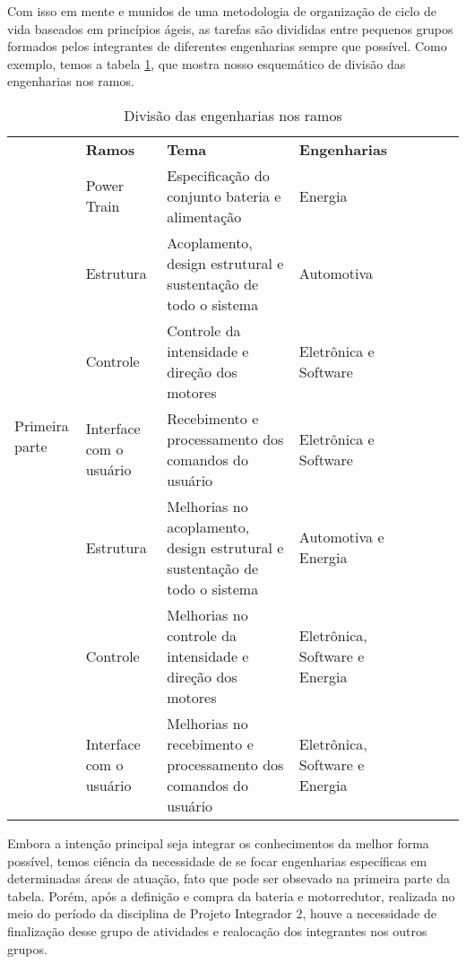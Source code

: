 Com isso em mente e munidos de uma metodologia de organização de ciclo de vida baseados em princípios ágeis, as tarefas são divididas entre pequenos grupos formados pelos integrantes de diferentes engenharias sempre que possível. Como exemplo, temos a tabela \ref{tab:divisao_ramos}, que mostra nosso esquemático de divisão das engenharias nos ramos.

\begin{table}[]
	\centering
	\caption{Divisão das engenharias nos ramos}
	\label{tab:divisao_ramos}
	\begin{tabular}{lp{}|lp{}|lp{}|lp{}}
		\cline{2-4}	& \textbf{Ramos}  & \textbf{Tema} & \textbf{Engenharias} & \\ \cline{1-4}

		\multicolumn{1}{|l|}{\multirow{6}{*}{{Primeira parte}}} & Power Train & Especificação do conjunto bateria e alimentação & Energia & \\ \cline{2-4}
		\multicolumn{1}{|l|}{} & Estrutura & Acoplamento, design estrutural e sustentação de todo o sistema & Automotiva & \\ \cline{2-4}
		\multicolumn{1}{|l|}{} & Controle & Controle da intensidade e direção dos motores & Eletrônica e Software & \\ \cline{2-4}
		\multicolumn{1}{|l|}{} & Interface com o usuário & Recebimento e processamento dos comandos do usuário & Eletrônica e Software & \\	\cline{1-4}

		\multicolumn{1}{|l|}{\multirow{3}{*}{{Segunda parte}}} & Estrutura               & Melhorias no acoplamento, design estrutural e sustentação de todo o sistema & Automotiva e Energia & \\ \cline{2-4}
		\multicolumn{1}{|l|}{} & Controle & Melhorias no controle da intensidade e direção dos motores & Eletrônica, Software e Energia & \\ \cline{2-4}
		\multicolumn{1}{|l|}{} & Interface com o usuário & Melhorias no recebimento e processamento dos comandos do usuário & Eletrônica, Software e Energia & \\ \cline{1-4}
	\end{tabular}
\end{table}

Embora a intenção principal seja integrar os conhecimentos da melhor forma possível, temos ciência da necessidade de se focar engenharias específicas em determinadas áreas de atuação, fato que pode ser obsevado na primeira parte da tabela. Porém, após a definição e compra da bateria e motorredutor, realizada no meio do período da disciplina de Projeto Integrador 2, houve a necessidade de finalização desse grupo de atividades e realocação dos integrantes nos outros grupos.
